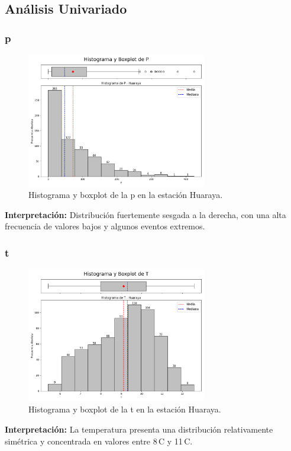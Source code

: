 \subsection{Análisis Univariado}

\subsubsection*{\gls{p} }
\begin{figure}[htbp]
\centering
\includegraphics[width=0.7\textwidth]{resultados/por_estacion_meteorologica/Huaraya/P_histograma.png}
\caption{Histograma y boxplot de la \gls{p}  en la estación Huaraya.}
\label{fig:huaraya_P}
\end{figure}
\textbf{Interpretación:} Distribución fuertemente sesgada a la derecha, con una alta frecuencia de valores bajos y algunos eventos extremos.

\subsubsection*{\gls{t} }
\begin{figure}[htbp]
\centering
\includegraphics[width=0.7\textwidth]{resultados/por_estacion_meteorologica/Huaraya/T_histograma.png}
\caption{Histograma y boxplot de la \gls{t}  en la estación Huaraya.}
\label{fig:huaraya_T}
\end{figure}
\textbf{Interpretación:} La temperatura presenta una distribución relativamente simétrica y concentrada en valores entre 8\,\textdegree C y 11\,\textdegree C.

